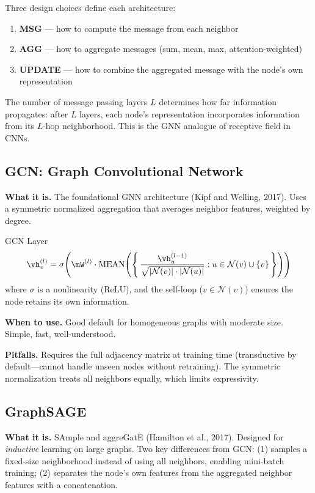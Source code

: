 Three design choices define each architecture:
\begin{enumerate}
    \item \textbf{MSG} --- how to compute the message from each neighbor
    \item \textbf{AGG} --- how to aggregate messages (sum, mean, max, attention-weighted)
    \item \textbf{UPDATE} --- how to combine the aggregated message with the node's own representation
\end{enumerate}

The number of message passing layers $L$ determines how far information propagates: after $L$ layers, each node's representation incorporates information from its $L$-hop neighborhood. This is the GNN analogue of receptive field in CNNs.

\subsection{GCN: Graph Convolutional Network}

\textbf{What it is.} The foundational GNN architecture (Kipf and Welling, 2017). Uses a symmetric normalized aggregation that averages neighbor features, weighted by degree.

\begin{mathresult}{GCN Layer}
\begin{equation}
\vh_v^{(l)} = \sigma\!\left(\mW^{(l)} \cdot \text{MEAN}\!\left(\left\{\,\frac{\vh_u^{(l-1)}}{\sqrt{|\mathcal{N}(v)| \cdot |\mathcal{N}(u)|}} : u \in \mathcal{N}(v) \cup \{v\}\,\right\}\right)\right)
\label{eq:gcn}
\end{equation}
where $\sigma$ is a nonlinearity (ReLU), and the self-loop ($v \in \mathcal{N}(v)$) ensures the node retains its own information.
\end{mathresult}

\textbf{When to use.} Good default for homogeneous graphs with moderate size. Simple, fast, well-understood.

\textbf{Pitfalls.} Requires the full adjacency matrix at training time (transductive by default---cannot handle unseen nodes without retraining). The symmetric normalization treats all neighbors equally, which limits expressivity.

\subsection{GraphSAGE}

\textbf{What it is.} SAmple and aggreGatE (Hamilton et al., 2017). Designed for \textit{inductive} learning on large graphs. Two key differences from GCN: (1) samples a fixed-size neighborhood instead of using all neighbors, enabling mini-batch training; (2) separates the node's own features from the aggregated neighbor features with a concatenation.

